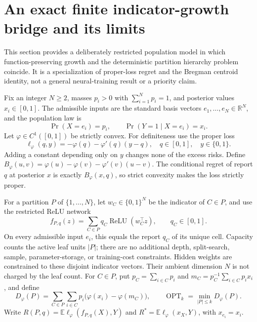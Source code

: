 \section{An exact finite indicator-growth bridge and its limits}
\label{sec:p9-indicator-bridge}

This section provides a deliberately restricted population model in which
function-preserving growth and the deterministic partition hierarchy problem
coincide. It is a specialization of proper-loss regret and the Bregman
centroid identity, not a general neural-training result or a priority claim.

Fix an integer $N\ge2$, masses $p_i>0$ with $\sum_{i=1}^N p_i=1$, and
posterior values $x_i\in[0,1]$. The admissible inputs are the standard basis
vectors $e_1,\ldots,e_N\in\mathbb R^N$, and the population law is
\[
 \Pr(X=e_i)=p_i,\qquad
 \Pr(Y=1\mid X=e_i)=x_i.
\]
Let $\varphi\in C^1([0,1])$ be strictly convex. For definiteness use the
proper loss
\[
 \ell_\varphi(q,y)=-\varphi(q)-\varphi'(q)(y-q),
 \quad q\in[0,1],\quad y\in\{0,1\}.
\]
Adding a constant depending only on $y$ changes none of the excess risks.
Define $B_\varphi(u,v)=\varphi(u)-\varphi(v)-\varphi'(v)(u-v)$.
The conditional regret of report $q$ at posterior $x$ is exactly
$B_\varphi(x,q)$, so strict convexity makes the loss strictly proper.

For a partition $P$ of $\{1,\ldots,N\}$, let $w_C\in\{0,1\}^N$ be
the indicator of $C\in P$, and use the restricted ReLU network
\[
 f_{P,q}(z)=\sum_{C\in P}q_C\operatorname{ReLU}(w_C^\top z),
 \qquad q_C\in[0,1].
\]
On every admissible input $e_i$, this equals the report $q_C$ of its
unique cell. Capacity counts the active leaf units $|P|$; there are no
additional depth, split-search, sample, parameter-storage, or training-cost
constraints. Hidden weights are constrained to these disjoint indicator
vectors. Their ambient dimension $N$ is not charged by the leaf count.
For $C\in P$, put $p_C=\sum_{i\in C}p_i$ and
$m_C=p_C^{-1}\sum_{i\in C}p_ix_i$, and define
\[
 D_\varphi(P)=\sum_{C\in P}\sum_{i\in C}
 p_i\bigl(\varphi(x_i)-\varphi(m_C)\bigr),\qquad
 \operatorname{OPT}_k=\min_{|P|\le k}D_\varphi(P).
\]
Write $R(P,q)=\mathbb E\ell_\varphi(f_{P,q}(X),Y)$ and
$R^*=\mathbb E\ell_\varphi(x_X,Y)$, with $x_{e_i}=x_i$.

